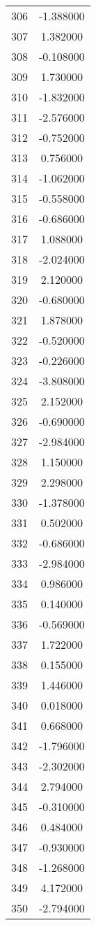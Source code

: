 \documentclass[12pt]{article}
\begin{document}
\begin{longtable}{@{}cc@{}}
306 & -1.388000 \\
307 & 1.382000 \\
308 & -0.108000 \\
309 & 1.730000 \\
310 & -1.832000 \\
311 & -2.576000 \\
312 & -0.752000 \\
313 & 0.756000 \\
314 & -1.062000 \\
315 & -0.558000 \\
316 & -0.686000 \\
317 & 1.088000 \\
318 & -2.024000 \\
319 & 2.120000 \\
320 & -0.680000 \\
321 & 1.878000 \\
322 & -0.520000 \\
323 & -0.226000 \\
324 & -3.808000 \\
325 & 2.152000 \\
326 & -0.690000 \\
327 & -2.984000 \\
328 & 1.150000 \\
329 & 2.298000 \\
330 & -1.378000 \\
331 & 0.502000 \\
332 & -0.686000 \\
333 & -2.984000 \\
334 & 0.986000 \\
335 & 0.140000 \\
336 & -0.569000 \\
337 & 1.722000 \\
338 & 0.155000 \\
339 & 1.446000 \\
340 & 0.018000 \\
341 & 0.668000 \\
342 & -1.796000 \\
343 & -2.302000 \\
344 & 2.794000 \\
345 & -0.310000 \\
346 & 0.484000 \\
347 & -0.930000 \\
348 & -1.268000 \\
349 & 4.172000 \\
350 & -2.794000 \\

\end{longtable}
\end{document}
